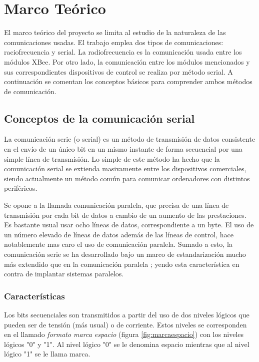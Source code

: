 \chapter{Marco Teórico}

El marco teórico del proyecto se limita al estudio de la naturaleza de las comunicaciones usadas. El trabajo emplea dos tipos de comunicaciones: raciofrecuencia y serial. La radiofrecuencia es la comunicación usada entre los módulos XBee. Por otro lado, la comunicación entre los módulos mencionados y sus correspondientes dispositivos de control se realiza por método serial. A continuación se comentan los conceptos básicos para comprender ambos métodos de comunicación.

\section{Conceptos de la comunicación serial}

La comunicación serie (o serial) es un método de transmisión de datos consistente en el envío de un único bit en un mismo instante de forma secuencial por una simple línea de transmisión. Lo simple de este método ha hecho que la comunicación serial se extienda masivamente entre los dispositivos comerciales, siendo actualmente un método común para comunicar ordenadores con distintos periféricos.

Se opone a la llamada comunicación paralela, que precisa de una línea de transmisión por cada bit de datos a cambio de un aumento de las prestaciones. Es bastante usual usar ocho líneas de datos, correspondiente a un byte. El uso de un número elevado de líneas de datos además de las líneas de control, hace notablemente mas caro el uso de comunicación paralela. Sumado a esto, la comunicación serie se ha desarrollado bajo un marco de estandarización mucho más extendido que en la comunicación paralela \cite{DispLogicos}; yendo esta característica en contra de implantar sistemas paralelos.

\subsection{Características}

Los bits secuenciales son transmitidos a partir del uso de dos niveles lógicos que pueden ser de tensión (más usual) o de corriente. Estos niveles se corresponden en el llamado \textit{formato marca espacio} (figura \ref{fig:marcaespacio}) con los niveles lógicos "0" y "1". Al nivel lógico "0" se le denomina espacio mientras que al nivel lógico "1" se le llama marca.

